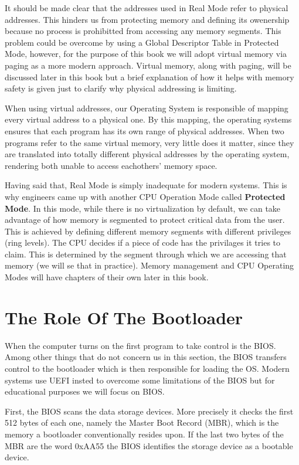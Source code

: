 It should be made clear that the addresses used in Real Mode refer to physical addresses. This hinders us from protecting
memory and defining its owenership because no process is prohibitted from accessing any memory segments.
This problem could be overcome by using a Global Descriptor Table in Protected Mode, however, for the purpose of this book we 
will adopt virtual memory via paging as a more modern approach. Virtual memory, along with paging, will be discussed later in this 
book but a brief explanation of how it helps with memory safety is given just to clarify why physical addressing is limiting.

When using virtual addresses, our Operating System is responsible of mapping every virtual address to a physical one.
By this mapping, the operating systems ensures that each program has its own range of physical addresses.
When two programs refer to the same virtual memory, very little does it matter, since they are translated into 
totally different physical addresses by the operating system, rendering both unable to access eachothers' memory space.

Having said that, Real Mode is simply inadequate for modern systems. This is why engineers came up with another CPU 
Operation Mode called \textbf{Protected Mode}. In this mode, while there is no virtualization by default, we can 
take advantage of how memory is segmented to protect critical data from the user. This is achieved by defining different 
memory segments with different privileges (ring levels). The CPU decides if a piece of code has the privilages 
it tries to claim. This is determined by the segment through which we are accessing that memory (we will se that in
practice). Memory management and CPU Operating Modes will have chapters of their own later in this book.

\section{The Role Of The Bootloader}

When the computer turns on the first program to take control is the BIOS. Among other things that do not concern us in 
this section, the BIOS transfers control to the bootloader which is then responsible for loading the OS. Modern systems 
use UEFI insted to overcome some limitations of the BIOS but for educational purposes we will focus on BIOS.

First, the BIOS scans the data storage devices. More precisely it checks the first 512 bytes of each one, namely the Master Boot Record 
(MBR), which is the memory a bootloader conventionally resides upon. If the last two bytes of the MBR are the word 0xAA55 the BIOS 
identifies the storage device as a bootable device.

